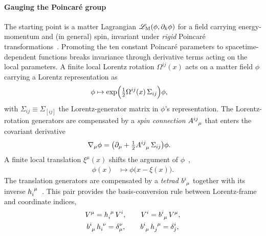 \paragraph*{Gauging the Poincar\'{e} group}
\label{FieldContent}
The starting point is a matter Lagrangian
$\mathscr{L}_{\mathrm M}(\phi,\partial_k\phi)$ for a field carrying
energy-momentum and (in general) spin,
invariant under \emph{rigid} Poincar\'{e}
transformations~\cite{kibble1961lorentz,utiyama1956invariant,sciama1962physical,blagojevic2003lectures,lasenby2016scale}.
Promoting the ten constant Poincar\'{e} parameters to spacetime-dependent
functions breaks invariance through derivative terms acting on the
local parameters. A finite local
Lorentz rotation $\Omega^{ij}(x)$ acts on a matter field $\phi$ carrying a Lorentz representation
as~\cite{lasenby2016scale}
\begin{align}
  \phi &\mapsto \exp\Bigl(\tfrac{1}{2}\Omega^{ij}(x)\,\Sigma_{ij}\Bigr)\phi,
  \label{LorentzMatterTransform}
\end{align}
with $\Sigma_{ij} \equiv \Sigma_{[ij]}$ the
Lorentz-generator matrix in $\phi$'s representation.
The Lorentz-rotation generators
are compensated by a \emph{spin connection} $\tensor{A}{^{ij}_\mu}$ that
enters the covariant
derivative~\cite[eq.~(1.7)]{blagojevic2003lectures}
\begin{align}
  \nabla_\mu\phi &= \bigl(\partial_\mu
    + \tfrac{1}{2}\tensor{A}{^{ij}_\mu}\,\Sigma_{ij}\bigr)\phi.
  \label{LorentzCovariantDeriv}
\end{align}
A finite local translation $\xi^\mu(x)$ shifts the argument of
$\phi$~\cite{lasenby2016scale},
\begin{align}
  \phi(x) &\mapsto \phi\bigl(x - \xi(x)\bigr).
  \label{TranslationMatterTransform}
\end{align}
The translation generators are compensated by a \emph{tetrad}
$\tensor{b}{^i_\mu}$ together with its inverse
$\tensor{h}{_i^\mu}$~\cite{hehl1976spin,blagojevic2002gravitation,blagojevic2003lectures,hehlobukhov2007cartan,blagojevicHehl2013,hehl1995metric,barker2024poincare}.
This pair provides the basis-conversion rule between
Lorentz-frame and coordinate indices,
\begin{subequations}
\begin{gather}
  V^\mu = \tensor{h}{_i^\mu}\,V^i,
  \qquad
  V^i = \tensor{b}{^i_\mu}\,V^\mu, \\
  \tensor{b}{^i_\mu}\,\tensor{h}{_i^\nu} = \delta^\nu_\mu,
  \qquad
  \tensor{b}{^i_\mu}\,\tensor{h}{_j^\mu} = \delta^i_j,
  \label{TetradIndexConversion}
\end{gather}
\end{subequations}
